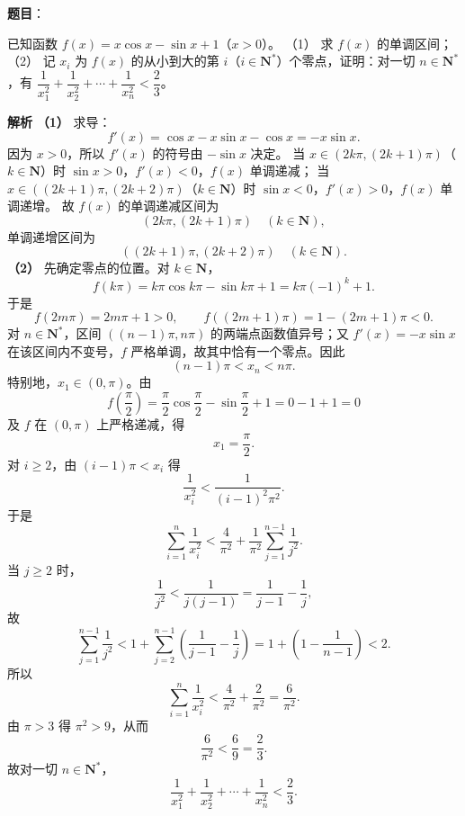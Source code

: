 \begin{answer}

\textbf{题目}：

已知函数 $f(x)=x\cos x-\sin x+1$（$x>0$）。
（1） 求 $f(x)$ 的单调区间；
（2） 记 $x_i$ 为 $f(x)$ 的从小到大的第 $i$（$i\in\mathbf N^*$）个零点，证明：对一切 $n\in\mathbf N^*$，有 $\dfrac1{x_1^2}+\dfrac1{x_2^2}+\cdots+\dfrac1{x_n^2}<\dfrac23$。

\textbf{解析}
\textbf{（1）} 求导：
\nopagebreak[4]
\[f'(x)=\cos x-x\sin x-\cos x=-x\sin x .\]
因为 $x>0$，所以 $f'(x)$ 的符号由 $-\sin x$ 决定。
当 $x\in(2k\pi,(2k+1)\pi)$（$k\in\mathbf N$）时 $\sin x>0$，$f'(x)<0$，$f(x)$ 单调递减；
当 $x\in((2k+1)\pi,(2k+2)\pi)$（$k\in\mathbf N$）时 $\sin x<0$，$f'(x)>0$，$f(x)$ 单调递增。
故 $f(x)$ 的单调递减区间为
\nopagebreak[4]
\[\left(2k\pi,(2k+1)\pi\right)\quad(k\in\mathbf N),\]
单调递增区间为
\nopagebreak[4]
\[\left((2k+1)\pi,(2k+2)\pi\right)\quad(k\in\mathbf N).\]
\textbf{（2）} 先确定零点的位置。对 $k\in\mathbf N$，
\nopagebreak[4]
\[f(k\pi)=k\pi\cos k\pi-\sin k\pi+1=k\pi(-1)^k+1 .\]
于是
\nopagebreak[4]
\[f(2m\pi)=2m\pi+1>0,\qquad f((2m+1)\pi)=1-(2m+1)\pi<0 .\]
对 $n\in\mathbf N^*$，区间 $((n-1)\pi,n\pi)$ 的两端点函数值异号；又 $f'(x)=-x\sin x$ 在该区间内不变号，$f$ 严格单调，故其中恰有一个零点。因此
\nopagebreak[4]
\[(n-1)\pi<x_n<n\pi .\]
特别地，$x_1\in(0,\pi)$。由
\nopagebreak[4]
\[f\left(\frac\pi2\right)=\frac\pi2\cos\frac\pi2-\sin\frac\pi2+1=0-1+1=0\]
及 $f$ 在 $(0,\pi)$ 上严格递减，得
\nopagebreak[4]
\[x_1=\frac\pi2 .\]
对 $i\geqslant2$，由 $(i-1)\pi<x_i$ 得
\nopagebreak[4]
\[\frac1{x_i^2}<\frac1{(i-1)^2\pi^2} .\]
于是
\nopagebreak[4]
\[\sum_{i=1}^n\frac1{x_i^2}
<\frac4{\pi^2}+\frac1{\pi^2}\sum_{j=1}^{n-1}\frac1{j^2} .\]
当 $j\geqslant2$ 时，
\nopagebreak[4]
\[\frac1{j^2}<\frac1{j(j-1)}=\frac1{j-1}-\frac1j,\]
故
\nopagebreak[4]
\[\sum_{j=1}^{n-1}\frac1{j^2}
<1+\sum_{j=2}^{n-1}\left(\frac1{j-1}-\frac1j\right)
=1+\left(1-\frac1{n-1}\right)<2 .\]
所以
\nopagebreak[4]
\[\sum_{i=1}^n\frac1{x_i^2}<\frac4{\pi^2}+\frac2{\pi^2}=\frac6{\pi^2} .\]
由 $\pi>3$ 得 $\pi^2>9$，从而
\nopagebreak[4]
\[\frac6{\pi^2}<\frac69=\frac23 .\]
故对一切 $n\in\mathbf N^*$，
\nopagebreak[4]
\[\frac1{x_1^2}+\frac1{x_2^2}+\cdots+\frac1{x_n^2}<\frac23 .\]



\end{answer}